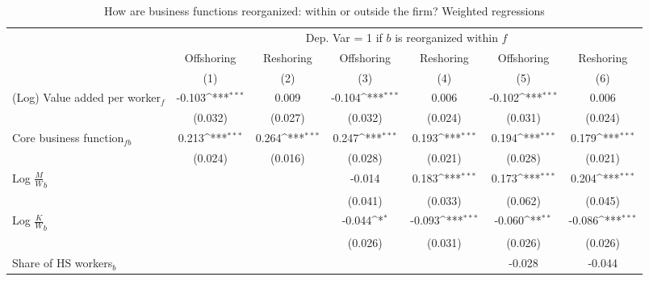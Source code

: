 \begin{table}[htbp] \footnotesize \centering
\def\sym#1{\ifmmode^{#1}\else\(^{#1}\)\fi}
\caption{How are business functions reorganized: within or outside the firm? Weighted regressions \label{tab:reg_how_appendix}}
\renewcommand{\arraystretch}{1}
\begin{tabular}{l*{6}{c}}
\toprule
&\multicolumn{6}{c}{Dep. Var = 1 if $ b $ is reorganized within $ f $} \\
\cmidrule(lr){2-7}
                &\multicolumn{1}{c}{Offshoring}&\multicolumn{1}{c}{Reshoring}&\multicolumn{1}{c}{Offshoring}&\multicolumn{1}{c}{Reshoring}&\multicolumn{1}{c}{Offshoring}&\multicolumn{1}{c}{Reshoring}\\\cmidrule(lr){2-2}\cmidrule(lr){3-3}\cmidrule(lr){4-4}\cmidrule(lr){5-5}\cmidrule(lr){6-6}\cmidrule(lr){7-7}
                &\multicolumn{1}{c}{(1)}         &\multicolumn{1}{c}{(2)}         &\multicolumn{1}{c}{(3)}         &\multicolumn{1}{c}{(4)}         &\multicolumn{1}{c}{(5)}         &\multicolumn{1}{c}{(6)}         \\
\midrule
(Log) Value added per worker$ _f$&   -0.103\sym{***}&    0.009         &   -0.104\sym{***}&    0.006         &   -0.102\sym{***}&    0.006         \\
                &  (0.032)         &  (0.027)         &  (0.032)         &  (0.024)         &  (0.031)         &  (0.024)         \\
\addlinespace
Core business function$ _{fb}$&    0.213\sym{***}&    0.264\sym{***}&    0.247\sym{***}&    0.193\sym{***}&    0.194\sym{***}&    0.179\sym{***}\\
                &  (0.024)         &  (0.016)         &  (0.028)         &  (0.021)         &  (0.028)         &  (0.021)         \\
\addlinespace
Log $\frac{M}{W}_b$&                  &                  &   -0.014         &    0.183\sym{***}&    0.173\sym{***}&    0.204\sym{***}\\
                &                  &                  &  (0.041)         &  (0.033)         &  (0.062)         &  (0.045)         \\
\addlinespace
Log $\frac{K}{W}_b$&                  &                  &   -0.044\sym{*}  &   -0.093\sym{***}&   -0.060\sym{**} &   -0.086\sym{***}\\
                &                  &                  &  (0.026)         &  (0.031)         &  (0.026)         &  (0.026)         \\
\addlinespace
Share of HS workers$ _b$&                  &                  &                  &                  &   -0.028         &   -0.044         \\

\end{tabular}
\end{table}
